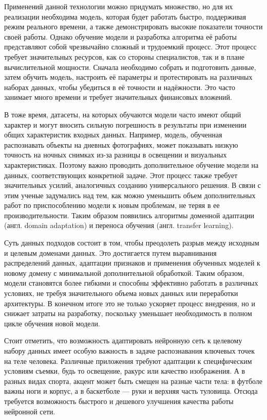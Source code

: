 \hfill \break
Применений данной технологии можно придумать множество, но для их реализации необходима модель, которая будет работать быстро, поддерживая режим реального времени, а также демонстрировать высокие показатели точности своей работы. Однако обучение модели и разработка алгоритма её работы представляют собой чрезвычайно сложный и трудоемкий процесс. Этот процесс требует значительных ресурсов, как со стороны специалистов, так и в плане вычислительной мощности. Сначала необходимо собрать и подготовить данные, затем обучить модель, настроить её параметры и протестировать на различных наборах данных, чтобы убедиться в её точности и надёжности. Это часто занимает много времени и требует значительных финансовых вложений. 

В тоже время, датасеты, на которых обучаются модели часто имеют общий характер и могут вносить сильную погрешность в результаты при изменении общих характеристик входных данных. Например, модель, обученная распознавать объекты на дневных фотографиях, может показывать низкую точность на ночных снимках из-за разницы в освещении и визуальных характеристиках. Поэтому важно проводить дополнительное обучение модели на данных, соответствующих конкретной задаче. Этот процесс также требует значительных усилий, аналогичных созданию универсального решения. В связи с этим ученые задумались над тем, как можно уменьшить объем дополнительных работ по приспособлению модели к новым проблемам, не теряя в ее производительности. Таким образом появились алгоритмы доменной адаптации (англ. domain adaptation) и переноса обучения (англ. transfer learning).

Суть данных подходов состоит в том, чтобы преодолеть разрыв между исходным и целевым доменами данных. Это достигается путем выравнивания распределений данных, адаптации признаков и применения обученных моделей к новому домену с минимальной дополнительной обработкой. Таким образом, модели становятся более гибкими и способны эффективно работать в различных условиях, не требуя значительного объема новых данных или переработки архитектуры. В конечном итоге это не только ускоряет процесс внедрения, но и снижает затраты на разработку, поскольку уменьшает необходимость в полном цикле обучения новой модели.

\hfill \break

Стоит отметить, что возможность адаптировать нейронную сеть к целевому набору данных имеет особую важность в задаче распознавания ключевых точек на теле человека. Различные приложения требуют адаптации к специфическим условиям съемки, будь то освещение, ракурс или качество изображения. А в разных видах спорта, акцент может быть смещен на разные части тела: в футболе важны ноги и корпус, а в баскетболе — руки и верхняя часть туловища. Отсюда требуется возможность быстрого и дешевого улучшения качества работы нейронной сети. 

